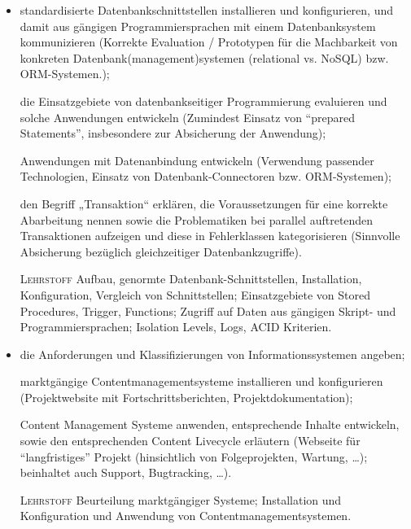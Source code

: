 \begin{itemize}[label={-}]
    \item standardisierte Datenbankschnittstellen installieren und konfigurieren, und damit aus gängigen Programmiersprachen mit einem Datenbanksystem kommunizieren
        {\color{red}(Korrekte Evaluation / Prototypen für die Machbarkeit von konkreten Datenbank(management)systemen (relational vs. NoSQL) bzw. ORM-Systemen.)};
    \item[] die Einsatzgebiete von datenbankseitiger Programmierung evaluieren und solche Anwendungen entwickeln
        {\color{red}(Zumindest Einsatz von \enquote{prepared Statements}, insbesondere zur Absicherung der Anwendung)};
    \item[] Anwendungen mit Datenanbindung entwickeln
        {\color{red}(Verwendung passender Technologien, Einsatz von Datenbank-Connectoren bzw. ORM-Systemen)};
    \item[] den Begriff „Transaktion“ erklären, die Voraussetzungen für eine korrekte Abarbeitung nennen sowie die Problematiken bei parallel auftretenden Transaktionen aufzeigen und diese in Fehlerklassen kategorisieren
        {\color{red}(Sinnvolle Absicherung bezüglich gleichzeitiger Datenbankzugriffe)}.
    \item[\tiny\textsc{Lehrstoff}] Aufbau, genormte Datenbank-Schnittstellen, Installation, Konfiguration, Vergleich von Schnittstellen; Einsatzgebiete von Stored Procedures, Trigger, Functions; Zugriff auf Daten aus gängigen Skript- und Programmiersprachen; Isolation Levels, Logs, ACID Kriterien.
\end{itemize}

\begin{itemize}[label={-}]
    \item die Anforderungen und Klassifizierungen von Informationssystemen angeben;
    \item[] marktgängige Contentmanagementsysteme installieren und konfigurieren
        {\color{red}(Projektwebsite mit Fortschrittsberichten, Projektdokumentation)};
    \item[] Content Management Systeme anwenden, entsprechende Inhalte entwickeln, sowie den entsprechenden Content Livecycle erläutern
        {\color{red}(Webseite für \enquote{langfristiges} Projekt (hinsichtlich von Folgeprojekten, Wartung, \dots); beinhaltet auch Support, Bugtracking, \dots)}.
    \item[\tiny\textsc{Lehrstoff}] Beurteilung marktgängiger Systeme; Installation und Konfiguration und Anwendung von Contentmanagementsystemen. 
\end{itemize}

